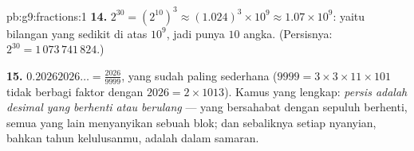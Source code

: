 \begin{solution}{pb:g9:fractions:1}
\textbf{14.} $2^{30} = \left(2^{10}\right)^3 \approx
(1.024)^3 \times 10^9 \approx 1.07 \times 10^9$: yaitu bilangan
yang sedikit di atas $10^9$, jadi punya $10$ angka. (Persisnya:
$2^{30} = 1\,073\,741\,824$.)

\textbf{15.} $0.20262026\ldots = \frac{2026}{9999}$, yang sudah
paling sederhana ($9999 = 3 \times 3 \times 11 \times 101$ tidak
berbagi faktor dengan $2026 = 2 \times 1013$). Kamus yang lengkap:
\emph{ persis adalah desimal yang berhenti atau berulang} ---
 yang bersahabat dengan sepuluh berhenti, semua yang lain
menyanyikan sebuah blok; dan sebaliknya setiap nyanyian, bahkan tahun
kelulusanmu, adalah  dalam samaran.

\end{solution}
